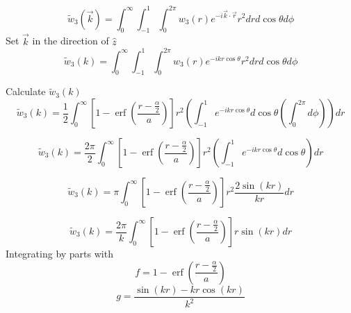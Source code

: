 \documentclass[double,12pt]{beavtex}
\begin{document}
\begin{equation}{\widetilde{w}_3(\vec{k})=\int_{0}^{\infty}\int_{-1}^{1}\int_{0}^{2\pi}w_3(r)e^{-i\vec{k}\cdot{\vec{r}}}r^2d{r}d{\cos\theta}d{\phi}}\end{equation}
Set $\vec{k}$ in the direction of $\hat{z}$ 
\begin{equation}{\widetilde{w}_3(k)=\int_{0}^{\infty}\int_{-1}^{1}\int_{0}^{2\pi}w_3(r)e^{-ikr\cos\theta}r^2d{r}d{\cos\theta}d{\phi}}\end{equation}

\noindent Calculate $\widetilde{w}_3(k)$ 
\begin{equation}{\widetilde{w}_3(k)=\frac{1}{2}\int_{0}^{\infty}\left[1-\operatorname{erf}\left(\frac{r-\frac{\alpha}{2}}{a}\right)\right]r^2\left(\int_{-1}^{1}e^{-ikr\cos\theta}d{\cos\theta}\left(\int_{0}^{2\pi}d{\phi}\right)\right)d{r}}\end{equation}

\begin{equation}{\widetilde{w}_3(k)=\frac{2\pi}{2}\int_{0}^{\infty}\left[1-\operatorname{erf}\left(\frac{r-\frac{\alpha}{2}}{a}\right)\right]r^2\left(\int_{-1}^{1}e^{-ikr\cos\theta}d{\cos\theta}\right)d{r}}\end{equation}

\begin{equation}{\widetilde{w}_3(k)=\pi\int_{0}^{\infty}\left[1-\operatorname{erf}\left(\frac{r-\frac{\alpha}{2}}{a}\right)\right]r^2\frac{2\sin(kr)}{kr}d{r}}\end{equation}

\begin{equation}{\widetilde{w}_3(k)=\frac{2\pi}{k}\int_{0}^{\infty}\left[1-\operatorname{erf}\left(\frac{r-\frac{\alpha}{2}}{a}\right)\right]r\sin(kr)d{r}}\end{equation}
Integrating by parts with 
\begin{displaymath}{f=1-\operatorname{erf}\left(\frac{r-\frac{\alpha}{2}}{a}\right)}\end{displaymath}
\begin{displaymath}{g=\frac{\sin(kr)-kr\cos(kr)}{k^2}}\end{displaymath}
\end{document}
